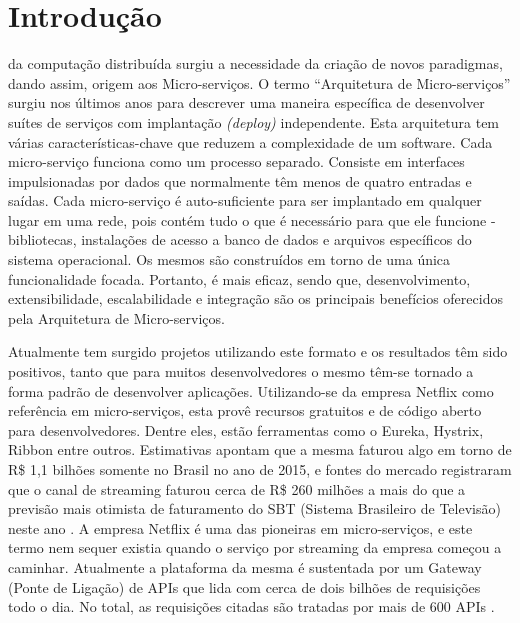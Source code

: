 \documentclass[journal]{IEEEtran}
\begin{document}
\section{Introdução}
% 
% 
% 
% 
 da computação distribuída surgiu a necessidade da criação de novos paradigmas, dando assim, origem aos Micro-serviços. O termo “Arquitetura de Micro-serviços” surgiu nos últimos anos para descrever uma maneira específica de desenvolver suítes de serviços com implantação \emph{(deploy)} independente. Esta arquitetura tem várias características-chave que reduzem a complexidade de um software. Cada micro-serviço funciona como um processo separado. Consiste em interfaces impulsionadas por dados que normalmente têm menos de quatro entradas e saídas. Cada micro-serviço é auto-suficiente para ser implantado em qualquer lugar em uma rede, pois contém tudo o que é necessário para que ele funcione - bibliotecas, instalações de acesso a banco de dados e arquivos específicos do sistema operacional. Os mesmos são construídos em torno de uma única funcionalidade focada. Portanto, é mais eficaz, sendo que, desenvolvimento, extensibilidade, escalabilidade e integração são os principais benefícios oferecidos pela Arquitetura de Micro-serviços. 

Atualmente tem surgido projetos utilizando este formato e os resultados têm sido positivos, tanto que para muitos desenvolvedores o mesmo têm-se tornado a forma padrão de desenvolver aplicações. Utilizando-se da empresa Netflix como referência em micro-serviços, esta provê recursos gratuitos e de código aberto para desenvolvedores. Dentre eles, estão ferramentas como o Eureka, Hystrix, Ribbon entre outros. Estimativas apontam que a mesma faturou algo em torno de R\$ 1,1 bilhões somente no Brasil no ano de 2015, e fontes do mercado registraram que o canal de streaming faturou cerca de R\$ 260 milhões a mais do que a previsão mais otimista de faturamento do SBT (Sistema Brasileiro de Televisão) neste ano \cite{RicardoFeltrin}. A empresa Netflix é uma das pioneiras em micro-serviços, e este termo nem sequer existia quando o serviço por streaming da empresa começou a caminhar. Atualmente a plataforma da mesma é sustentada por um Gateway (Ponte de Ligação) de APIs que lida com cerca de dois bilhões de requisições todo o dia. No total, as requisições citadas são tratadas por mais de 600 APIs \cite{SmartBear}. 
\end{document}
